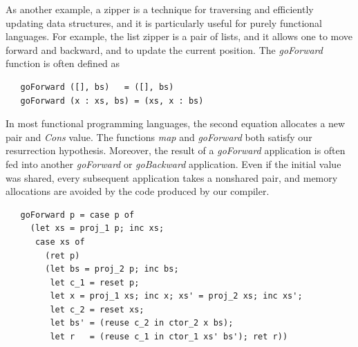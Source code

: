 As another example, a zipper is a technique for traversing and efficiently updating data structures, and it is particularly useful for
purely functional languages. For example, the list zipper is a pair of lists, and it allows one to
move forward and backward, and to update the current position.
The \textit{goForward} function is often defined as
\begin{lstlisting}
   goForward ([], bs)   = ([], bs)
   goForward (x : xs, bs) = (xs, x : bs)
\end{lstlisting}
In most functional programming languages, the second equation allocates a
new pair and \textit{Cons} value.  %
The functions \textit{map} and \textit{goForward} both satisfy our
resurrection hypothesis. Moreover, the result of a \textit{goForward}
application is often fed into another \textit{goForward} or
\textit{goBackward} application.  Even if the initial value was shared,
every subsequent application takes a nonshared pair, and
memory allocations are avoided by the code produced by our compiler.
\begin{lstlisting}
   goForward p = case p of
     (let xs = proj_1 p; inc xs;
      case xs of
        (ret p)
        (let bs = proj_2 p; inc bs;
         let c_1 = reset p;
         let x = proj_1 xs; inc x; xs' = proj_2 xs; inc xs';
         let c_2 = reset xs;
         let bs' = (reuse c_2 in ctor_2 x bs);
         let r   = (reuse c_1 in ctor_1 xs' bs'); ret r))
\end{lstlisting}



